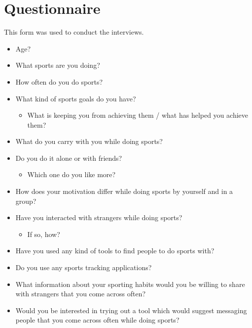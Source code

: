 \section{Questionnaire}
\label{sec:app1_1}

This form was used to conduct the interviews.

\begin{itemize}
	\item Age?
	\item What sports are you doing?
	\item How often do you do sports?
	\item What kind of sports goals do you have?
		\begin{itemize}
			\item What is keeping you from achieving them / what has helped you achieve them?
		\end{itemize}
	\item What do you carry with you while doing sports?
	\item Do you do it alone or with friends?
		\begin{itemize}
			\item Which one do you like more?
		\end{itemize}
	\item How does your motivation differ while doing sports by yourself and in a group?
	\item Have you interacted with strangers while doing sports?
		\begin{itemize}
			\item If so, how?
		\end{itemize}
	\item Have you used any kind of tools to find people to do sports with?
	\item Do you use any sports tracking applications?
	\item What information about your sporting habits would you be willing to share with strangers that you come across often?
	\item Would you be interested in trying out a tool which would suggest messaging people that you come across often while doing sports?
\end{itemize}

%
%
%
%

